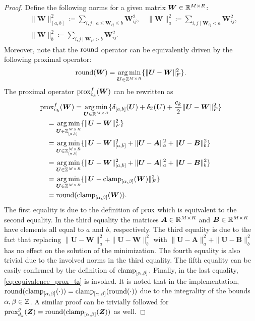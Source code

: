\begin{proof}
    Define the following norms for a given matrix $\bm W \in \mathbb{R}^{M\times R}$:
    \begin{align*}
         & \|\bm W\|_{[a,b]}^2 \coloneqq \sum_{i,j \mid a \leq \bm W_{ij} \leq b} \bm W_{ij}^2, \quad
        \|\bm W\|_a^2 \coloneqq \sum_{i,j \mid \bm W_{ij} < a} \bm W_{ij}^2,                          \\
         & \|\bm W\|_b^2 \coloneqq \sum_{i,j \mid \bm W_{ij} > b} \bm W_{ij}^2.
    \end{align*}
    Moreover, note that the $\operatorname{round}$ operator  can be equivalently driven by the following proximal operator:
    \begin{equation}
        \operatorname{round}(\bm W) = \operatorname*{arg\,min}_{\bm U \in \mathbb{Z}^{M\times R}}\{\|\bm U - \bm W\|^2_F\}.
        \label{eq:equivalence_prox_tz}
    \end{equation}
    The proximal operator $\operatorname{prox}^f_{c_k}(\bm W)$ can be rewritten as
    \begin{align*}
        \rm{pr} & {\rm{ox}}^f_{c_k}(\bm W) = \operatorname*{arg\,min}_{\bm U \in \mathbb{R}^{M\times R}}\{\delta_{[a,b]}(\bm U) + \delta_{\mathbb{Z}}(\bm U) + \frac{c_k}{2} \|\bm U - \bm W\|^2_F\} \\
                & = \operatorname*{arg\,min}_{\bm U \in \mathbb{Z}_{[a,b]}^{M\times R}}\{\|\bm U - \bm W\|^2_F\}                                                                             \\
                & = \operatorname*{arg\,min}_{\bm U \in \mathbb{Z}_{[a,b]}^{M\times R}}\{\|\bm U - \bm W\|^2_{[a,b]} + \|\bm U - \bm A\|^2_a + \|\bm U - \bm B\|^2_b\}                       \\
                & = \operatorname*{arg\,min}_{\bm U \in \mathbb{Z}^{M\times R}}\{\|\bm U - \bm W\|^2_{[a,b]} + \|\bm U - \bm A\|^2_a + \|\bm U - \bm B\|^2_b\}                               \\
                & = \operatorname*{arg\,min}_{\bm U \in \mathbb{Z}^{M\times R}}\{\|\bm U - \operatorname{clamp}_{[\alpha,\beta]}(\bm W)\|^2_F\}                                                            \\
                & = \operatorname{round}(\operatorname{clamp}_{[\alpha,\beta]}(\bm W)).
    \end{align*}
    The first equality is due to the definition of $\operatorname{prox}$ which is equivalent to the second equality.
    In the third equality the matrices $\bm A\in\mathbb{R}^{M\times R}$ and $\bm B\in\mathbb{R}^{M\times R}$ have elements all equal to $a$ and $b$, respectively.
    The third equality is due to the fact that replacing $\|\bm U - \bm W\|^2_a + \|\bm U - \bm W\|^2_b$ with $\|\bm U - \bm A\|^2_a + \|\bm U - \bm B\|^2_b$ has no effect on the solution of the minimization. The fourth equality is also trivial due to the involved norms in the third equality. The fifth equality can be easily confirmed by the definition of $\operatorname{clamp}_{[\alpha,\beta]}$.
    Finally, in the last equality, \eqref{eq:equivalence_prox_tz} is invoked.
    It is noted that in the implementation, $\operatorname{round}(\operatorname{clamp}_{[\alpha,\beta]}(\cdot)) = \operatorname{clamp}_{[\alpha,\beta]}(\operatorname{round}(\cdot))$ due to the integrality of the bounds $\alpha,\beta \in \mathbb{Z}$. A similar proof can be trivially followed for $\operatorname{prox}^g_{d_k}(\bm Z) = \operatorname{round}(\operatorname{clamp}_{[\alpha,\beta]}(\bm Z))$ as well.
\end{proof}

